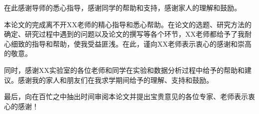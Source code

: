 在此感谢导师的悉心指导，感谢同学的帮助和支持，感谢家人的理解和鼓励。

本论文的完成离不开XX老师的精心指导和悉心帮助。在论文的选题、研究方法的确定、研究过程中遇到的问题以及论文的撰写等各个环节，XX老师都给予了我耐心细致的指导和帮助，使我受益匪浅。在此，谨向XX老师表示衷心的感谢和崇高的敬意。

同时，感谢XX实验室的各位老师和同学在实验和数据分析过程中给予的帮助和建议。感谢我的家人和朋友们在我求学期间给予的理解、支持和鼓励。

最后，向在百忙之中抽出时间审阅本论文并提出宝贵意见的各位专家、老师表示衷心的感谢！
